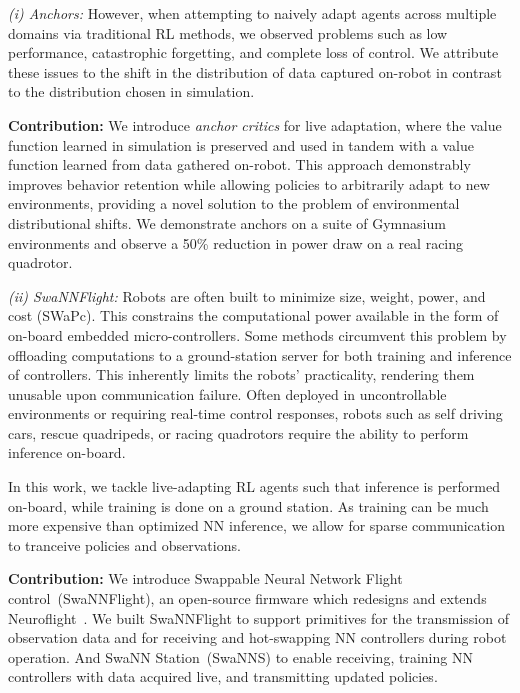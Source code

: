 \documentclass[letterpaper, 10 pt, conference]{ieeeconf} %
\newcommand{\firmwarelong}{Swappable Neural Network Flight control}
\newcommand{\firmware}{SwaNNFlight}
\newcommand{\framework}{SwaNNS}
\newcommand{\frameworklong}{SwaNN Station}
\begin{document}
    \textit{(i) Anchors:}
    However, when attempting to naively adapt agents across multiple domains via traditional RL methods, we observed problems such as low performance, catastrophic forgetting, and complete loss of control.
    We attribute these issues to the shift in the distribution of data captured on-robot in contrast to the distribution chosen in simulation.  
    
    \noindent\textbf{Contribution:} We introduce \emph{anchor critics} for live adaptation, where the value function learned in simulation is preserved and used in tandem with a value function learned from data gathered on-robot.
    This approach demonstrably improves behavior retention while allowing policies to arbitrarily adapt to new environments, providing a novel solution to the problem of environmental distributional shifts. We demonstrate anchors on a suite of Gymnasium environments and observe a 50\% reduction in power draw on a real racing quadrotor.

    \textit{(ii) \firmware{}:}
    Robots are often built to minimize size, weight, power, and cost (SWaPc).
    This constrains the computational power available in the form of on-board embedded micro-controllers.
    Some methods circumvent this problem by offloading computations to a ground-station server for both training and inference of controllers.
    This inherently limits the robots' practicality, rendering them unusable upon communication failure.
    Often deployed in uncontrollable environments or requiring real-time control responses, robots such as self driving cars, rescue quadripeds, or racing quadrotors require the ability to perform inference on-board.
    
    In this work, we tackle live-adapting RL agents such that inference is performed on-board, while training is done on a ground station.
    As training can be much more expensive than optimized NN inference, we allow for sparse communication to tranceive policies and observations.
    
    \noindent\textbf{Contribution:} We introduce \firmwarelong{}~(\firmware{}), an open-source firmware which redesigns and extends Neuroflight~\cite{NFori,NFv2}.
    We built \firmware{} to support primitives for the transmission of observation data and for receiving and hot-swapping NN controllers during robot operation.
    And \frameworklong{}~(\framework{}) to enable receiving, training NN controllers with data acquired live, and transmitting updated policies.
    
\end{document}
